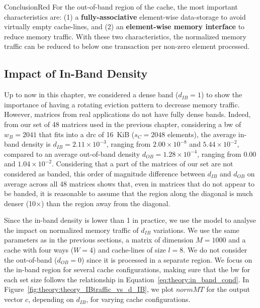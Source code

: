 \begin{highlight}{Conclusion}{Red}
    For the out-of-\gls{band} region of the cache, the most important characteristics are: (1) a \textbf{fully-associative} element-wise data-storage to avoid virtually empty cache-lines, and (2) an \textbf{element-wise memory interface} to reduce memory traffic.
    With these two characteristics, the normalized memory traffic can be reduced to below one transaction per non-zero element processed.
\end{highlight}

\subsection{Impact of In-Band Density}
\label{sec:theory:graph12}

Up to now in this chapter, we considered a dense \gls{band} ($d_\mathit{IB} = 1$) to show the importance of having a rotating \gls{eviction} pattern to decrease memory traffic.
However, matrices from real applications do not have fully dense \glspl{band}.
Indeed, from our set of 48 matrices used in the previous chapter, considering a \gls{bw} of $w_B = 2041$ that fits into a \acrshort{drc} of 16~KiB ($s_C = 2048$ elements), the average in-\gls{band} density is $d_\mathit{IB} = 2.11 \times 10^{-3}$, ranging from $2.00 \times 10^{-8}$ and $5.44 \times 10^{-2}$, compared to an average out-of-\gls{band} density $d_\mathit{OB} = 1.28 \times 10^{-4}$, ranging from $0.00$ and $1.04 \times 10^{-2}$.
Considering that a part of the matrices of our set are not considered as \gls{banded}, this order of magnitude difference between $d_\mathit{IB}$ and $d_\mathit{OB}$ on average across all 48 matrices shows that, even in matrices that do not appear to be \gls{banded}, it is reasonable to assume that the region along the diagonal is much denser (10$ \times$) than the region away from the diagonal.

Since the in-\gls{band} density is lower than 1 in practice, we use the model to analyse the impact on normalized memory traffic of $d_\mathit{IB}$ variations.
We use the same parameters as in the previous sections, a matrix of dimension $M = 1000$ and a cache with four \glspl{way} ($W = 4$) and cache-lines of size $l = 8$.
We do not consider the out-of-\gls{band} ($d_\mathit{OB} = 0$) since it is processed in a separate region.
We focus on the in-\gls{band} region for several cache configurations, making sure that the \gls{bw} for each \gls{set} size follows the relationship in Equation~\ref{eq:theory:in_band_cond}.
In Figure~\ref{fig:theory:theory_IBtraffic_vs_d_IB}, we plot $\mathit{normMT}$ for the output vector $c$, depending on $d_\mathit{IB}$, for varying cache configurations.

